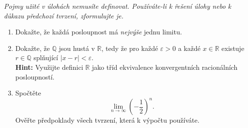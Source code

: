 \documentclass[a4paper,11pt]{article}
\newcommand{\R}{\mathbb{R}}
\newcommand{\Q}{\mathbb{Q}}
\begin{document}
 \begin{tcolorbox}[title=\textsf{Lehké úlohy a důkazy (6
  bodů)},arc=0mm,boxsep=3mm,bottomrule=1pt,toprule=3pt,leftrule=-0.1mm,
  rightrule=-0.1mm,colframe=Emerald!80!white,colback=Emerald!5!white]
  \emph{Pojmy užité v úlohách nemusíte definovat. Používáte-li k řešení úlohy
  nebo k důkazu předchozí tvrzení, zformulujte je.}
  \begin{enumerate}
   \item Dokažte, že každá posloupnost má \emph{nejvýše} jednu limitu.
   \item Dokažte, že $\Q$ jsou hustá v $\R$, tedy že pro každé $\varepsilon>0$ a
    každé $x \in \R$ existuje $r \in \Q$ splňující $|x - r|<\varepsilon$.\\
    \textbf{Hint:} Využijte definici $\R$ jako tříd ekvivalence konvergentních
    racionálních posloupností.
   \item Spočtěte
   \[
    \lim_{n \to \infty} \left( -\frac{1}{2} \right)^{n}.
   \]
   Ověřte předpoklady všech tvrzení, která k výpočtu používáte.
  \end{enumerate}
 \end{tcolorbox}
 \clearpage
\end{document}
